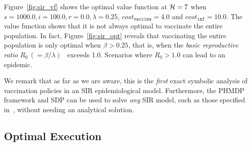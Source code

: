 Figure~\ref{fig:sir_vf} shows the optimal value function at {\footnotesize$ \mathcal{H} = 7 $} when {\footnotesize $ s = 1000.0, i = 100.0, r = 0.0, \lambda = 0.25 $}, {\footnotesize $ cost_{\mathtt{vaccine}} = 4.0$} and {\footnotesize $ cost_{\mathtt{inf}} = 10.0 $}. The value function shows that it is not always optimal to vaccinate the entire population. In fact, Figure~\ref{fig:sir_opt} reveals that vaccinating the entire population is only optimal when {\footnotesize $ \beta > 0.25 $}, that is, when the \textit{basic reproductive ratio} {\footnotesize $ R_0 \,(= \beta/\lambda)$}~\cite{Heffernan_2005} exceeds 1.0. Scenarios where {\footnotesize $R_0 > 1.0$} can lead to an epidemic. 

We remark that as far as we are aware, this is the \textit{first} exact symbolic analysis of vaccination policies in an SIR epidemiological model. Furthermore, the PHMDP framework and SDP can be used to solve \textit{any} SIR model, such as those specified in~\cite{LekoneFinkenstaedt_2006,CoburnWagnerBlower_2009}, without needing an analytical solution. 

\subsection{Optimal Execution}
\label{sec:results_oe}

